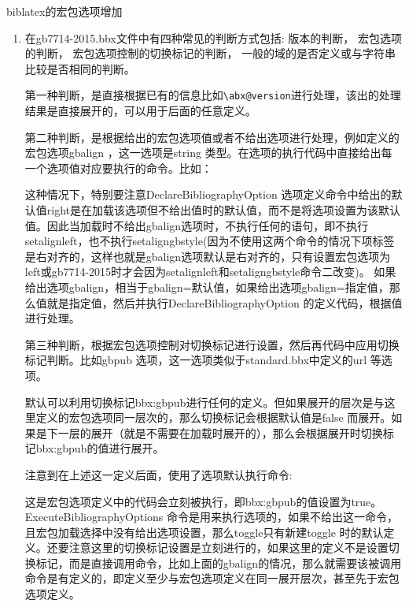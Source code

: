 biblatex的宏包选项增加
  \begin{enumerate}
    \item 在gb7714-2015.bbx文件中有四种常见的判断方式包括:
    版本的判断，
    宏包选项的判断，
    宏包选项控制的切换标记的判断，
    一般的域的是否定义或与字符串比较是否相同的判断。

        第一种判断，是直接根据已有的信息比如\verb|\abx@version|进行处理，该出的处理结果是直接展开的，可以用于后面的任意定义。

        第二种判断，是根据给出的宏包选项值或者不给出选项进行处理，例如定义的宏包选项gbalign ，这一选项是string 类型。在选项的执行代码中直接给出每一个选项值对应要执行的命令。比如：
        这种情况下，特别要注意DeclareBibliographyOption 选项定义命令中给出的默认值right是在加载该选项但不给出值时的默认值，而不是将选项设置为该默认值。因此当加载时不给出gbalign选项时，不执行任何的语句，即不执行setalignleft，也不执行setaligngbstyle(因为不使用这两个命令的情况下项标签是右对齐的，这样也就是gbalign选项默认是右对齐的，只有设置宏包选项为left或gb7714-2015时才会因为setalignleft和setaligngbstyle命令二改变)。
        如果给出选项gbalign，相当于gbalign=默认值，如果给出选项gbalign=指定值，那么值就是指定值，然后并执行DeclareBibliographyOption 的定义代码，根据值进行处理。

        第三种判断，根据宏包选项控制对切换标记进行设置，然后再代码中应用切换标记判断。比如gbpub 选项，这一选项类似于standard.bbx中定义的url 等选项。
        默认可以利用切换标记bbx:gbpub进行任何的定义。但如果展开的层次是与这里定义的宏包选项同一层次的，那么切换标记会根据默认值是false 而展开。如果是下一层的展开（就是不需要在加载时展开的），那么会根据展开时切换标记bbx:gbpub的值进行展开。

        注意到在上述这一定义后面，使用了选项默认执行命令:
        \begin{texlist}
        \end{texlist}
        这是宏包选项定义中的代码会立刻被执行，即bbx:gbpub的值设置为true。ExecuteBibliographyOptions 命令是用来执行选项的，如果不给出这一命令，且宏包加载选择中没有给出选项设置，那么toggle只有新建toggle 时的默认定义。还要注意这里的切换标记设置是立刻进行的，如果这里的定义不是设置切换标记，而是直接调用命令，比如上面的gbalign的情况，那么就需要该被调用命令是有定义的，即定义至少与宏包选项定义在同一展开层次，甚至先于宏包选项定义。


\end{enumerate}
